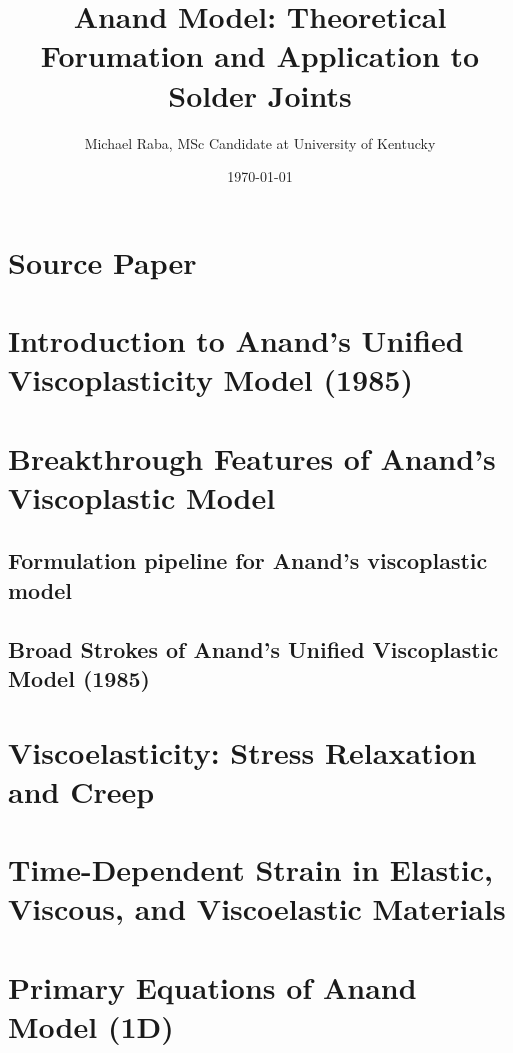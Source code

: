 \documentclass[11pt]{article}
\author{Michael Raba, MSc Candidate at University of Kentucky}
\date{\today}
\title{Anand Model: Theoretical Forumation and Application to Solder Joints}
\begin{document}
\maketitle


\section*{Source Paper}
\label{sec:orgff36678}



\section*{Introduction to Anand’s Unified Viscoplasticity Model (1985)}
\label{sec:orgc734ac1}



\section*{Breakthrough Features of Anand’s Viscoplastic Model}
\label{sec:org6b76f69}



\subsection*{Formulation pipeline for Anand’s viscoplastic model}
\label{sec:orgeaf79f2}


\subsection*{Broad Strokes of Anand’s Unified Viscoplastic Model (1985)}
\label{sec:org2f76ae6}



\section*{Viscoelasticity: Stress Relaxation and Creep}
\label{sec:org5dec26b}


\section*{Time-Dependent Strain in Elastic, Viscous, and Viscoelastic Materials}
\label{sec:orge19a51a}





\section*{Primary Equations of Anand Model (1D)}
\label{sec:org460d1e2}
\end{document}
